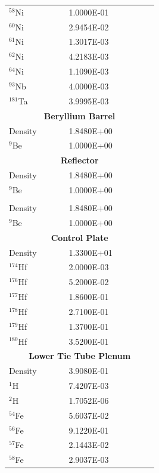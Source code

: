 \documentclass[8pt,a5paper]{article}
\begin{document}
\begin{longtable}{|m{0.3\linewidth}|m{0.45\linewidth}|}
    $^{58}$Ni & \SI{1.0000E-01}{} \\
    $^{60}$Ni & \SI{2.9454E-02}{} \\
    $^{61}$Ni & \SI{1.3017E-03}{} \\
    $^{62}$Ni & \SI{4.2183E-03}{} \\
    $^{64}$Ni & \SI{1.1090E-03}{} \\
    $^{93}$Nb & \SI{4.0000E-03}{} \\
    $^{181}$Ta & \SI{3.9995E-03}{} \\\hline
    \multicolumn{2}{|c|}{\textbf{Beryllium Barrel}}\\\hline
    Density & \SI{1.8480E+00}{} \\
    $^{9}$Be & \SI{1.0000E+00}{} \\\hline
    \multicolumn{2}{|c|}{\textbf{Reflector}}\\\hline
    Density & \SI{1.8480E+00}{} \\
    $^{9}$Be & \SI{1.0000E+00}{} \\\pagebreak
    \multicolumn{2}{|c|}{\textbf{Control Drum}}\\\hline
    Density & \SI{1.8480E+00}{} \\
    $^{9}$Be & \SI{1.0000E+00}{} \\\hline
    \multicolumn{2}{|c|}{\textbf{Control Plate}}\\\hline
    Density & \SI{1.3300E+01}{} \\
    $^{174}$Hf & \SI{2.0000E-03}{} \\
    $^{176}$Hf & \SI{5.2000E-02}{} \\
    $^{177}$Hf & \SI{1.8600E-01}{} \\
    $^{178}$Hf & \SI{2.7100E-01}{} \\
    $^{179}$Hf & \SI{1.3700E-01}{} \\
    $^{180}$Hf & \SI{3.5200E-01}{} \\\hline
    \multicolumn{2}{|c|}{\textbf{Lower Tie Tube Plenum}}\\\hline
    Density & \SI{3.9080E-01}{} \\
    $^{1}$H & \SI{7.4207E-03}{} \\
    $^{2}$H & \SI{1.7052E-06}{} \\
    $^{54}$Fe & \SI{5.6037E-02}{} \\
    $^{56}$Fe & \SI{9.1220E-01}{} \\
    $^{57}$Fe & \SI{2.1443E-02}{} \\
    $^{58}$Fe & \SI{2.9037E-03}{} \\\hline

\end{longtable}
\end{document}
